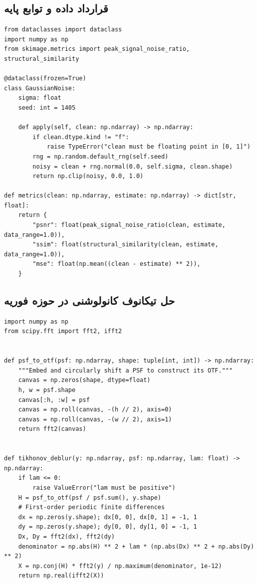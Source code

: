 \documentclass[12pt,openany,oneside]{book}
\begin{document}
\subsection{قرارداد داده و توابع پایه}
\begin{latin}
\begin{lstlisting}
from dataclasses import dataclass
import numpy as np
from skimage.metrics import peak_signal_noise_ratio, structural_similarity

@dataclass(frozen=True)
class GaussianNoise:
    sigma: float
    seed: int = 1405

    def apply(self, clean: np.ndarray) -> np.ndarray:
        if clean.dtype.kind != "f":
            raise TypeError("clean must be floating point in [0, 1]")
        rng = np.random.default_rng(self.seed)
        noisy = clean + rng.normal(0.0, self.sigma, clean.shape)
        return np.clip(noisy, 0.0, 1.0)

def metrics(clean: np.ndarray, estimate: np.ndarray) -> dict[str, float]:
    return {
        "psnr": float(peak_signal_noise_ratio(clean, estimate, data_range=1.0)),
        "ssim": float(structural_similarity(clean, estimate, data_range=1.0)),
        "mse": float(np.mean((clean - estimate) ** 2)),
    }
\end{lstlisting}
\end{latin}

\subsection{حل تیکانوف کانولوشنی در حوزه فوریه}
\begin{latin}
\begin{lstlisting}
import numpy as np
from scipy.fft import fft2, ifft2


def psf_to_otf(psf: np.ndarray, shape: tuple[int, int]) -> np.ndarray:
    """Embed and circularly shift a PSF to construct its OTF."""
    canvas = np.zeros(shape, dtype=float)
    h, w = psf.shape
    canvas[:h, :w] = psf
    canvas = np.roll(canvas, -(h // 2), axis=0)
    canvas = np.roll(canvas, -(w // 2), axis=1)
    return fft2(canvas)


def tikhonov_deblur(y: np.ndarray, psf: np.ndarray, lam: float) -> np.ndarray:
    if lam <= 0:
        raise ValueError("lam must be positive")
    H = psf_to_otf(psf / psf.sum(), y.shape)
    # First-order periodic finite differences
    dx = np.zeros(y.shape); dx[0, 0], dx[0, 1] = -1, 1
    dy = np.zeros(y.shape); dy[0, 0], dy[1, 0] = -1, 1
    Dx, Dy = fft2(dx), fft2(dy)
    denominator = np.abs(H) ** 2 + lam * (np.abs(Dx) ** 2 + np.abs(Dy) ** 2)
    X = np.conj(H) * fft2(y) / np.maximum(denominator, 1e-12)
    return np.real(ifft2(X))
\end{lstlisting}
\end{latin}
\end{document}
